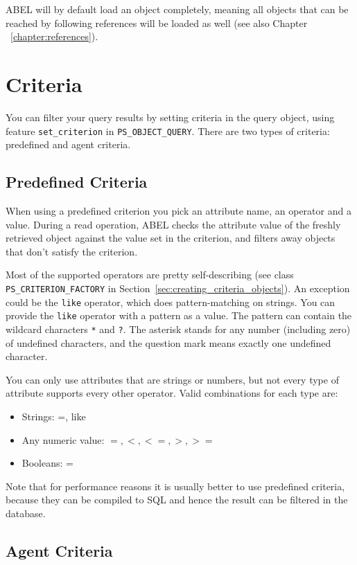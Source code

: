 \documentclass[a4paper,12pt]{report}
\begin{document}
ABEL will by default load an object completely, meaning all objects that can be reached by following references will be loaded as well (see also Chapter ~\ref{chapter:references}).

\section{Criteria}

You can filter your query results by setting criteria in the query object, using feature \lstinline{set_criterion} in \lstinline{PS_OBJECT_QUERY}.
There are two types of criteria: predefined and agent criteria.

\subsection{Predefined Criteria}
When using a predefined criterion you pick an attribute name, an operator and a value. 
During a read operation, ABEL checks the attribute value of the freshly retrieved object against the value set in the criterion, and filters away objects that don't satisfy the criterion.

Most of the supported operators are pretty self-describing (see class \lstinline{PS_CRITERION_FACTORY} in Section~\ref{sec:creating_criteria_objects}).
An exception could be the \lstinline!like! operator, which does pattern-matching on strings.
You can provide the \lstinline!like! operator with a pattern as a value. The pattern can contain the wildcard characters \lstinline!*! and \lstinline!?!.
The asterisk stands for any number (including zero) of undefined characters, and the question mark means exactly one undefined character.

You can only use attributes that are strings or numbers, but not every type of attribute supports every other operator. Valid combinations for each type are:

 \begin{itemize}
  \item Strings: =, like
  \item Any numeric value: $=, <, <=, >, >=$
  \item Booleans: =
 \end{itemize}

Note that for performance reasons it is usually better to use predefined criteria, because they can be compiled to SQL and hence the result can be filtered in the database.

\subsection{Agent Criteria}
\end{document}
